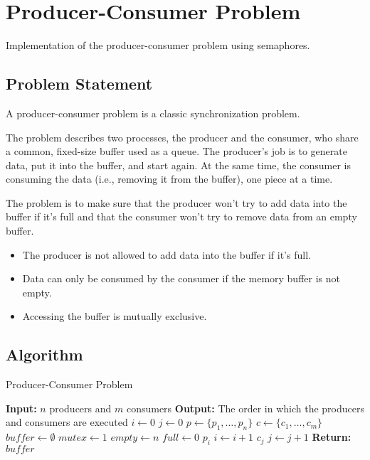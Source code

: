 \section{Producer-Consumer Problem}
\label{sec:producer_consumer}

Implementation of the producer-consumer problem using semaphores.

\subsection{Problem Statement}

A producer-consumer problem is a classic synchronization problem.

The problem describes two processes, the producer and the consumer, who share a common, fixed-size buffer used as a queue.
The producer's job is to generate data, put it into the buffer, and start again. At the same time, the consumer is consuming the data (i.e., removing it from the buffer), one piece at a time.

The problem is to make sure that the producer won't try to add data into the buffer if it's full and that the consumer won't try to remove data from an empty buffer.

\begin{itemize}
    \item The producer is not allowed to add data into the buffer if it's full.
    \item Data can only be consumed by the consumer if the memory buffer is not empty.
    \item Accessing the buffer is mutually exclusive.
\end{itemize}

\pagebreak

\subsection{Algorithm}

\begin{algorithm}
    \caption{Producer-Consumer Problem}
    \label{alg:producer_consumer}
    \begin{algorithmic}[1]
        \State \textbf{Input:} $n$ producers and $m$ consumers
        \State \textbf{Output:} The order in which the producers and consumers are executed
        \State $i \gets 0$ 
        \State $j \gets 0$ 
        \State $p \gets \{p_1, \dots, p_n\}$ 
        \State $c \gets \{c_1, \dots, c_m\}$ 
        \State $buffer \gets \emptyset$ 
        \State $mutex \gets 1$ 
        \State $empty \gets n$ 
        \State $full \gets 0$ 
                \State $p_i$ 
                \State $i \gets i + 1$
            \EndIf
                \State $c_j$ 
                \State $j \gets j + 1$
            \EndIf
        \EndWhile
        \State \textbf{Return:} $buffer$
    \end{algorithmic}
\end{algorithm}


